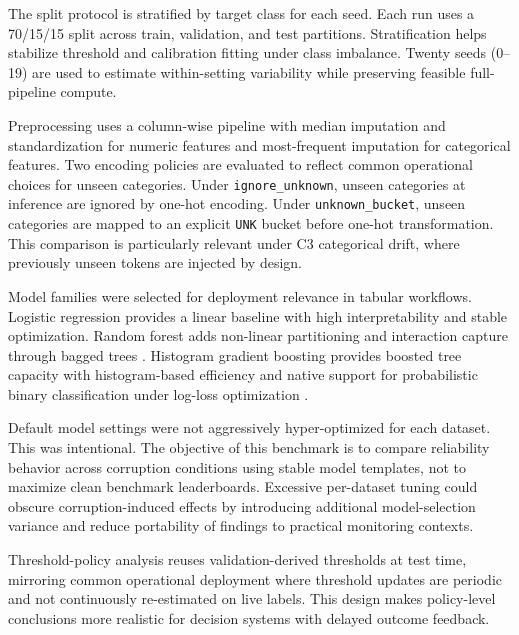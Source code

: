 \documentclass{AuthorGuide/ijitcs}
\begin{document}
The split protocol is stratified by target class for each seed. Each run uses a 70/15/15 split across train, validation, and test partitions. Stratification helps stabilize threshold and calibration fitting under class imbalance. Twenty seeds (0--19) are used to estimate within-setting variability while preserving feasible full-pipeline compute.

Preprocessing uses a column-wise pipeline with median imputation and standardization for numeric features and most-frequent imputation for categorical features. Two encoding policies are evaluated to reflect common operational choices for unseen categories. Under \texttt{ignore\_unknown}, unseen categories at inference are ignored by one-hot encoding. Under \texttt{unknown\_bucket}, unseen categories are mapped to an explicit \texttt{UNK} bucket before one-hot transformation. This comparison is particularly relevant under C3 categorical drift, where previously unseen tokens are injected by design.

Model families were selected for deployment relevance in tabular workflows. Logistic regression provides a linear baseline with high interpretability and stable optimization. Random forest adds non-linear partitioning and interaction capture through bagged trees \cite{breiman2001random}. Histogram gradient boosting provides boosted tree capacity with histogram-based efficiency and native support for probabilistic binary classification under log-loss optimization \cite{friedman2001gbm,sklearnHGBDocs}.

Default model settings were not aggressively hyper-optimized for each dataset. This was intentional. The objective of this benchmark is to compare reliability behavior across corruption conditions using stable model templates, not to maximize clean benchmark leaderboards. Excessive per-dataset tuning could obscure corruption-induced effects by introducing additional model-selection variance and reduce portability of findings to practical monitoring contexts.

Threshold-policy analysis reuses validation-derived thresholds at test time, mirroring common operational deployment where threshold updates are periodic and not continuously re-estimated on live labels. This design makes policy-level conclusions more realistic for decision systems with delayed outcome feedback.
\end{document}
